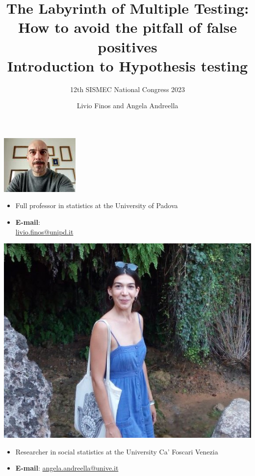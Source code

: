 \documentclass[xcolor={dvipsnames}]{beamer}
\title[]{The Labyrinth of Multiple Testing: How to avoid the pitfall of false positives \\
\vspace*{1cm} \large Introduction to Hypothesis testing}
\subtitle{\vspace*{2cm} \small 12th SISMEC National Congress 2023}
\date{}
\author[\hspace{5cm}]{Livio Finos and Angela Andreella}
\begin{document}
\begin{frame}
  \titlepage
\end{frame}

\begin{frame}
    \begin{minipage}[t]{0.45\textwidth}
\includegraphics[width= \textwidth]{Slides/MTP/plaatjes/Finos.jpg}
\begin{itemize}
    \item Full professor in statistics at the University of Padova
    \item \textbf{E-mail}: \\ \href{mailto:livio.finos@unipd.it}{livio.finos@unipd.it} 
\end{itemize}

\end{minipage}\hfill
\begin{minipage}[t]{0.45\textwidth}
  \includegraphics[width= .95\textwidth]{Slides/MTP/plaatjes/Andreella.jpg}
\begin{itemize}
    \item Researcher in social statistics at the University Ca' Foscari Venezia
    \item \textbf{E-mail}: \href{mailto:angela.andreella@unive.it}{angela.andreella@unive.it} 
\end{itemize}


\end{minipage}
\end{frame}
\end{document}
